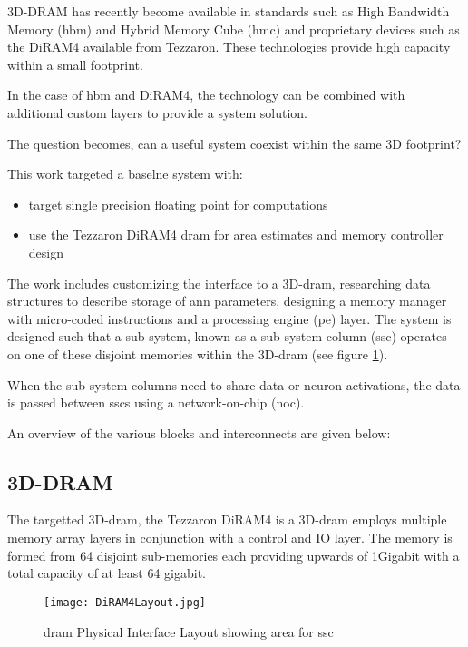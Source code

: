 3D-DRAM has recently become available in standards such as High Bandwidth Memory (\ac{hbm}) and Hybrid Memory Cube (\ac{hmc}) and proprietary devices such as the DiRAM4 available from Tezzaron. 
These technologies provide high capacity within a small footprint.

In the case of \ac{hbm} and DiRAM4, the technology can be combined with additional custom layers to provide a system solution.

The question becomes, can a useful system coexist within the same 3D footprint?

This work targeted a baselne system with:
\begin{itemize}
  \item target single precision floating point for computations
  \item use the Tezzaron DiRAM4 \ac{dram} for area estimates and memory controller design
\end{itemize}
The work includes customizing the interface to a 3D-\ac{dram}, researching data structures to describe storage of \ac{ann} parameters, designing a memory manager with micro-coded instructions and a processing engine (\ac{pe}) layer.  
The system is designed such that a sub-system, known as a sub-system column (\ac{ssc}) operates on one of these disjoint memories within the 3D-\ac{dram}  (see figure \ref{fig:diram4Layout}).

When the sub-system columns need to share data or neuron activations, the data is passed between \ac{ssc}s using a network-on-chip (\ac{noc}).

An overview of the various blocks and interconnects are given below:

\subsection{3D-DRAM}
The targetted 3D-\ac{dram}, the Tezzaron DiRAM4 is a 3D-\ac{dram} employs multiple memory array layers in conjunction with a control and IO layer.
The memory is formed from 64 disjoint sub-memories each providing upwards of 1Gigabit with a total capacity of at least 64 gigabit.
\begin{figure}[!t]
\centering
\captionsetup{justification=centering}
\captionsetup{width=.9\linewidth}
\centerline{
\mbox{\texttt{[image: DiRAM4Layout.jpg]}}
}
\caption{\ac{dram} Physical Interface Layout showing area for \ac{ssc}}
\label{fig:diram4Layout}
\end{figure}



